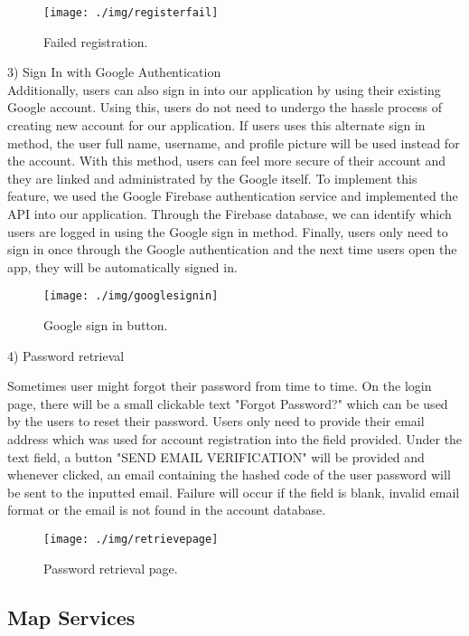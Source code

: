 \documentclass[conference]{IEEEtran}
\begin{document}
\begin{figure}[h!]
\texttt{[image: ./img/registerfail]}
\centering
\caption{Failed registration.}
\end{figure}

3) Sign In with Google Authentication\\

Additionally, users can also sign in into our application by using their existing Google account. Using this, users do not need to undergo the hassle process of creating new account for our application. If users uses this alternate sign in method, the user full name, username, and profile picture will be used instead for the account. With this method, users can feel more secure of their account and they are linked and administrated by the Google itself. To implement this feature, we used the Google Firebase authentication service and implemented the API into our application. Through the Firebase database, we can identify which users are logged in using the Google sign in method. Finally, users only need to sign in once through the Google authentication and the next time users open the app, they will be automatically signed in.


\begin{figure}[h!]
\texttt{[image: ./img/googlesignin]}
\centering
\caption{Google sign in button.}
\end{figure}



4) Password retrieval\\
\par Sometimes user might forgot their password from time to time. On the login page, there will be a small clickable text "Forgot Password?" which can be used by the users to reset their password. Users only need to provide their email address which was used for account registration into the field provided. Under the text field, a button "SEND EMAIL VERIFICATION" will be provided and whenever clicked, an email containing the hashed code of the user password will be sent to the inputted email. Failure will occur if the field is blank, invalid email format or the email is not found in the account database.

\begin{figure}[h!]
\texttt{[image: ./img/retrievepage]}
\centering
\caption{Password retrieval page.}
\end{figure}

\subsection{Map Services}
\end{document}
